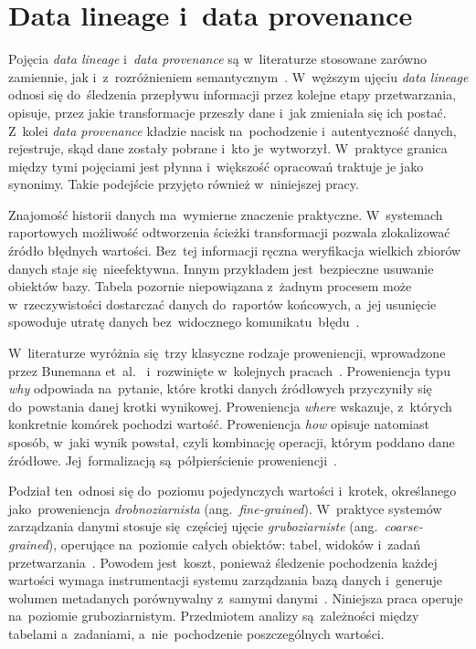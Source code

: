 \documentclass[polish,master,a4paper,oneside]{ppfcmthesis}
\renewcommand{\_}{\origtextunderscore\ifmmode\else\allowbreak\fi}
\begin{document}
\section{Data lineage i~data provenance}
\label{sec:lineage_def}

Pojęcia \emph{data lineage} i~\emph{data provenance} są w~literaturze
stosowane zarówno zamiennie, jak i~z~rozróżnieniem semantycznym~\cite{Psallidas2023}.
W~węższym ujęciu \emph{data lineage} odnosi się do~śledzenia przepływu
informacji przez kolejne etapy przetwarzania, opisuje, przez jakie
transformacje przeszły dane i~jak zmieniała się ich postać. Z~kolei
\emph{data provenance} kładzie nacisk na~pochodzenie i~autentyczność danych,
rejestruje, skąd dane zostały pobrane i~kto je~wytworzył. W~praktyce
granica między tymi pojęciami jest płynna i~większość opracowań traktuje je
jako synonimy. Takie podejście przyjęto również w~niniejszej pracy.

Znajomość historii danych ma~wymierne znaczenie praktyczne. W~systemach
raportowych możliwość odtworzenia ścieżki transformacji pozwala zlokalizować
źródło błędnych wartości. Bez~tej informacji ręczna weryfikacja wielkich
zbiorów danych staje się~nieefektywna. Innym przykładem jest~bezpieczne
usuwanie
obiektów bazy. Tabela pozornie niepowiązana z~żadnym procesem może
w~rzeczywistości dostarczać danych do~raportów końcowych, a~jej usunięcie
spowoduje utratę danych bez~widocznego komunikatu~błędu~\cite{Boinski2025}.

W~literaturze wyróżnia się~trzy klasyczne rodzaje proweniencji, wprowadzone
przez Bunemana et~al.~\cite{Buneman2001} i~rozwinięte w~kolejnych
pracach~\cite{Green2007,Herschel2017}. Proweniencja typu \emph{why}
odpowiada na~pytanie, które krotki danych źródłowych przyczyniły się
do~powstania danej krotki wynikowej. Proweniencja \emph{where} wskazuje,
z~których konkretnie komórek pochodzi wartość. Proweniencja \emph{how}
opisuje natomiast sposób, w~jaki wynik powstał, czyli kombinację operacji,
którym poddano dane źródłowe. Jej~formalizacją są~półpierścienie
proweniencji~\cite{Green2007}.

Podział ten~odnosi się do~poziomu pojedynczych wartości i~krotek, określanego
jako~proweniencja \emph{drobnoziarnista} (ang.~\emph{fine-grained}).
W~praktyce systemów zarządzania danymi stosuje się~częściej ujęcie
\emph{gruboziarniste} (ang.~\emph{coarse-grained}), operujące na~poziomie
całych obiektów: tabel, widoków i~zadań przetwarzania~\cite{Psallidas2023}.
Powodem jest~koszt, ponieważ śledzenie pochodzenia każdej wartości wymaga
instrumentacji systemu zarządzania bazą danych i~generuje wolumen metadanych
porównywalny z~samymi danymi~\cite{CuiWidom2003}. Niniejsza praca operuje
na~poziomie gruboziarnistym. Przedmiotem analizy są~zależności między
tabelami a~zadaniami, a~nie~pochodzenie poszczególnych wartości.
\end{document}
